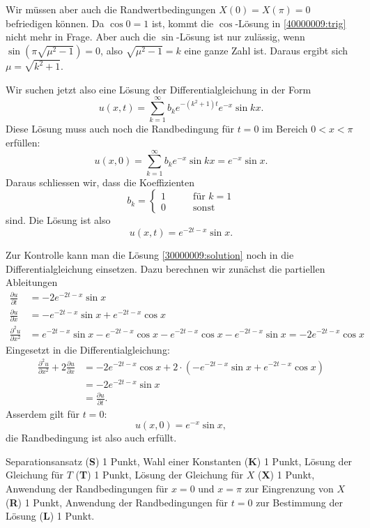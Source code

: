 \begin{loesung}
Wir müssen aber auch die Randwertbedingungen
$X(0)=X(\pi)=0$
befriedigen können.
Da $\cos 0=1$ ist, kommt die $\cos$-Lösung
in \eqref{40000009:trig} nicht mehr in Frage.
Aber auch die $\sin$-Lösung ist nur
zulässig, wenn $\sin(\pi\sqrt{\mu^2-1})=0$, also
$\sqrt{\mu^2-1}=k$ eine ganze Zahl ist.
Daraus ergibt sich $\mu=\sqrt{k^2+1}$.

Wir suchen jetzt also eine
Lösung der Differentialgleichung in der Form
\[
u(x,t)=\sum_{k=1}^\infty b_ke^{-(k^2+1)t}e^{-x}\sin kx.
\]
Diese Lösung muss auch noch die Randbedingung für $t=0$ im
Bereich $0<x<\pi$ erfüllen:
\[
u(x,0)=\sum_{k=1}^\infty b_ke^{-x}\sin kx=e^{-x}\sin x.
\]
Daraus schliessen wir, dass die Koeffizienten
\[
b_k=\begin{cases}
1&\qquad\text{für $k=1$}\\
0&\qquad\text{sonst}
\end{cases}
\]
sind. Die Lösung ist also
\begin{equation}
u(x,t)=
e^{-2t-x}\sin x.
\label{30000009:solution}
\end{equation}
\end{loesung}

\begin{diskussion}
Zur Kontrolle kann man die Lösung \eqref{30000009:solution}
noch in die Differentialgleichung einsetzen.
Dazu berechnen wir zunächst die partiellen Ableitungen
\begin{align*}
\frac{\partial u}{\partial t}
&=
-2 e^{-2t-x}\sin x
\\
\frac{\partial u}{\partial x}
&=
- e^{-2t-x}\sin x + 
e^{-2t-x}\cos x
\\
\frac{\partial^2 u}{\partial x^2}
&=
e^{-2t-x}\sin x 
- e^{-2t-x}\cos x 
-e^{-2t-x}\cos x
-e^{-2t-x}\sin x
=
-2 e^{-2t-x}\cos x
\end{align*}
Eingesetzt in die Differentialgleichung:
\begin{align*}
\frac{\partial^2 u}{\partial x^2}+2\frac{\partial u}{\partial x}
&=
-2 e^{-2t-x}\cos x
+
2\cdot(
- e^{-2t-x}\sin x + 
e^{-2t-x}\cos x
)
\\
&=
-2 e^{-2t-x}\sin x 
\\
&=\frac{\partial u}{\partial t}.
\end{align*}
Asserdem gilt für $t=0$:
\[
u(x,0)=e^{-x}\sin x,
\]
die Randbedingung ist also auch erfüllt.
\end{diskussion}

\begin{bewertung}
Separationsansatz ({\bf S}) 1 Punkt,
Wahl einer Konstanten ({\bf K}) 1 Punkt,
Lösung der Gleichung für $T$ ({\bf T}) 1 Punkt,
Lösung der Gleichung für $X$ ({\bf X}) 1 Punkt,
Anwendung der Randbedingungen für $x=0$ und $x=\pi$
zur Eingrenzung von $X$ ({\bf R}) 1 Punkt,
Anwendung der Randbedingungen für $t=0$ zur Bestimmung 
der Lösung ({\bf L}) 1 Punkt.
\end{bewertung}

